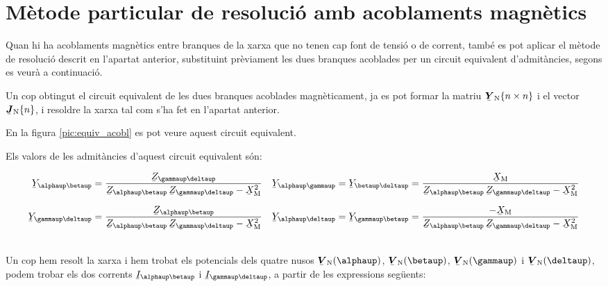 \section{Mètode particular de resolució amb acoblaments magnètics}

Quan hi ha acoblaments magnètics entre branques de la xarxa que no
tenen cap font de tensió o de corrent, també es pot aplicar el
mètode de resolució descrit en l'apartat anterior, substituint
prèviament les dues branques acoblades per un circuit equivalent
d'admitàncies, segons es veurà a continuació. 

Un cop obtingut el circuit equivalent de les dues branques acoblades
magnèticament, ja es pot formar la matriu $\mcmplx{Y}\ped{N}\{n \times n\}$ i
el vector $\mcmplx{J}\ped{N}\{n\}$, i  resoldre la xarxa tal com s'ha fet en
l'apartat anterior.

En la figura \vref{pic:equiv_acobl} es pot veure aquest circuit
equivalent.
\begin{center}
\centering
   
    \label{pic:equiv_acobl}
\end{center}

Els valors de les admitàncies d'aquest circuit equivalent
són:

\parbox{15cm}
{ \begin{align*}
   \cmplx{Y}_{\alphaup\betaup} &= \frac{\cmplx{Z}_{\gammaup\deltaup}}{\cmplx{Z}_{\alphaup\betaup}\, \cmplx{Z}_{\gammaup\deltaup}-\cmplx{X}\ped{M}^2} &
   \cmplx{Y}_{\alphaup\gammaup} &= \cmplx{Y}_{\betaup\deltaup} = \frac{\cmplx{X}\ped{M}}{\cmplx{Z}_{\alphaup\betaup}\, \cmplx{Z}_{\gammaup\deltaup}-\cmplx{X}\ped{M}^2} \\[1.5ex]
   \cmplx{Y}_{\gammaup\deltaup} &= \frac{\cmplx{Z}_{\alphaup\betaup}}{\cmplx{Z}_{\alphaup\betaup}\, \cmplx{Z}_{\gammaup\deltaup}-\cmplx{X}\ped{M}^2} &
   \cmplx{Y}_{\alphaup\deltaup} &= \cmplx{Y}_{\gammaup\betaup} = \frac{-\cmplx{X}\ped{M}}{\cmplx{Z}_{\alphaup\betaup}\, \cmplx{Z}_{\gammaup\deltaup}-\cmplx{X}\ped{M}^2}
\end{align*} }
\hfill
\parbox{1cm}{\begin{align}\end{align}}

Un cop hem resolt la xarxa i hem trobat els potencials dels quatre
nusos $\mcmplx{V}\ped{N}(\alphaup)$, $\mcmplx{V}\ped{N}(\betaup)$,
$\mcmplx{V}\ped{N}(\gammaup)$ i $\mcmplx{V}\ped{N}(\deltaup)$, podem
trobar els dos corrents $\cmplx{I}_{\alphaup\betaup}$ i
$\cmplx{I}_{\gammaup\deltaup}$, a partir de les expressions següents:

